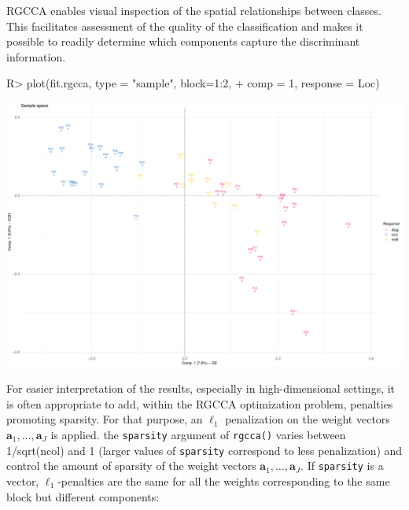 \documentclass[
]{jss}
\begin{document}
\normalsize

RGCCA enables visual inspection of the spatial relationships between
classes. This facilitates assessment of the quality of the
classification and makes it possible to readily determine which
components capture the discriminant information.

\footnotesize

\begin{CodeChunk}
\begin{CodeInput}
R> plot(fit.rgcca, type = "sample", block=1:2,
+      comp = 1, response = Loc)
\end{CodeInput}


\begin{center}\includegraphics{RGCCA_files/figure-latex/unnamed-chunk-40-1} \end{center}

\end{CodeChunk}

\normalsize

For easier interpretation of the results, especially in high-dimensional
settings, it is often appropriate to add, within the RGCCA optimization
problem, penalties promoting sparsity. For that purpose, an \(\ell_1\)
penalization on the weight vectors
\(\mathbf{a}_1, \ldots, \mathbf{a}_J\) is applied. the \texttt{sparsity}
argument of \texttt{rgcca()} varies between 1/sqrt(ncol) and 1 (larger
values of \texttt{sparsity} correspond to less penalization) and control
the amount of sparsity of the weight vectors
\(\mathbf{a}_1, \ldots, \mathbf{a}_J\). If \texttt{sparsity} is a
vector, \(\ell_1\)-penalties are the same for all the weights
corresponding to the same block but different components:
\end{document}
